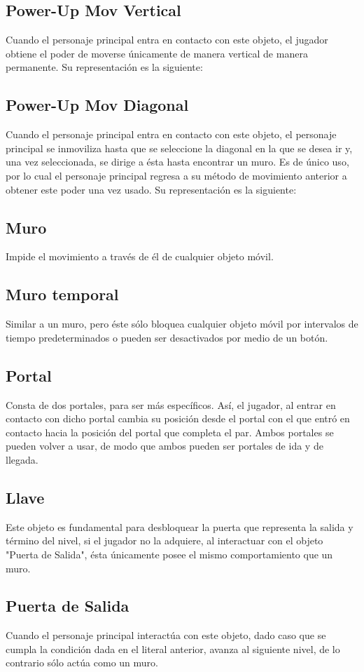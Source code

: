 \documentclass{article}
\begin{document}
\subsection{Power-Up Mov Vertical}
Cuando el personaje principal entra en contacto con este objeto, el jugador obtiene el poder de moverse únicamente de manera vertical de manera permanente. Su representación es la siguiente:
\subsection{Power-Up Mov Diagonal}
Cuando el personaje principal entra en contacto con este objeto, el personaje principal se inmoviliza hasta que se seleccione la diagonal en la que se desea ir y, una vez seleccionada, se dirige a ésta hasta encontrar un muro. Es de único uso, por lo cual el personaje principal regresa a su método de movimiento anterior a obtener este poder una vez usado. Su representación es la siguiente:
\subsection{Muro}
Impide el movimiento a través de él de cualquier objeto móvil.
\subsection{Muro temporal}
Similar a un muro, pero éste sólo bloquea cualquier objeto móvil por intervalos de tiempo predeterminados o pueden ser desactivados por medio de un botón.
\subsection{Portal}
Consta de dos portales, para ser más específicos. Así, el jugador, al entrar en contacto con dicho portal cambia su posición desde el portal con el que entró en contacto hacia la posición del portal que completa el par. Ambos portales se pueden volver a usar, de modo que ambos pueden ser portales de ida y de llegada.
\subsection{Llave}
Este objeto es fundamental para desbloquear la puerta que representa la salida y término del nivel, si el jugador no la adquiere, al interactuar con el objeto "Puerta de Salida", ésta únicamente posee el mismo comportamiento que un muro. 
\subsection{Puerta de Salida}
Cuando el personaje principal interactúa con este objeto, dado caso que se cumpla la condición dada en el literal anterior, avanza al siguiente nivel, de lo contrario sólo actúa como un muro.


\end{document}
